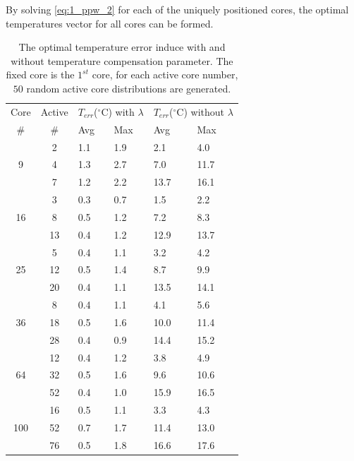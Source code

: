 By solving \eqref{eq:1_ppw_2} for each of the uniquely positioned cores, the optimal temperatures vector for all cores can be formed.

\begin{table}
  \caption{The optimal temperature error induce with and without temperature compensation parameter. The fixed core is the $1^{st}$ core, for each active core number, $50$ random active core distributions are generated.}
  \label{tab:compensation}
  \centering
  \begin{tabular}{c|c||p{1cm}<{\centering}|p{1cm}<{\centering}||p{1cm}<{\centering}|p{1cm}<{\centering}}
    \hline
    Core & Active     & \multicolumn{2}{c||}{$T_{err}$($^{\circ}$C)  with $\lambda$}  & \multicolumn{2}{c}{$T_{err}$($^{\circ}$C) without $\lambda$}\\
\cline{3-6}
    \#       &   \#       &  Avg    & Max &  Avg  &  Max  \\
     \hline
\hline
  \multirow{3}{*}{9} &      2       &   1.1  &   1.9 &2.1&4.0\\
             &      4       &    1.3    &   2.7  &7.0&11.7 \\
             &      7       &   1.2     &   2.2   &13.7&16.1\\
     \hline
   \multirow{3}{*}{16} &      3        &   0.3 &   0.7   &1.5 &2.2 \\   
             &      8       &    0.5     &  1.2  &7.2 &8.3   \\
             &      13     &     0.4    &   1.2  &12.9 &13.7 \\
     \hline
  \multirow{3}{*}{25} &      5       &    0.4 & 1.1 & 3.2 &  4.2   \\ 
              &     12      &    0.5     &    1.4   &  8.7 & 9.9 \\
              &     20      &    0.4     &    1.1   & 13.5 & 14.1 \\ 
     \hline
  \multirow{3}{*}{36}  &     8        &    0.4  &    1.1 & 4.1 & 5.6\\
              &     18      &   0.5      &   1.6  & 10.0 & 11.4  \\
              &     28      &    0.4     &   0.9 & 14.4 & 15.2\\
     \hline
  \multirow{3}{*}{64}  &     12      &   0.4  &   1.2  & 3.8 &4.9 \\
              &     32      &    0.5     &     1.6   & 9.6 & 10.6   \\
              &     52      &     0.4   &     1.0   & 15.9 & 16.5\\
 \hline 
\multirow{3}{*}{100}  & 16 & 	 0.5&	1.1& 3.3 &  4.3\\
                      & 52 &	 0.7&	1.7& 11.4 & 13.0\\
                      & 76 &	 0.5&	1.8& 16.6 & 17.6\\
\hline
\end{tabular}
\end{table}


